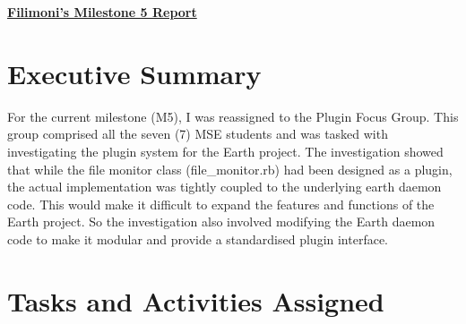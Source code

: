 \begin{center}
{\large\textbf{\underline{{Filimoni's Milestone 5 Report}}}}
\end{center}

\section*{Executive Summary}

For the current milestone (M5), I was reassigned to the Plugin Focus Group. This group comprised all the seven (7) MSE students and 
was tasked with investigating the plugin system for the Earth project. The investigation showed that while the file monitor class 
(file\_monitor.rb) had been designed as a plugin, the actual implementation was tightly coupled to the underlying earth daemon code.
This would make it difficult to expand the features and functions of the Earth project. So the investigation also involved modifying
the Earth daemon code to make it modular and provide a standardised plugin interface.


\section*{Tasks and Activities Assigned}

